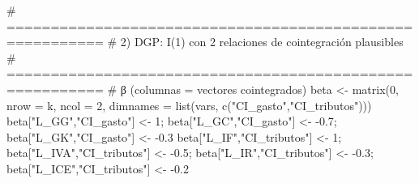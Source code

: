 \documentclass[
  spanish,
  letterpaper,
  DIV=11,
  numbers=noendperiod]{scrartcl}
\newenvironment{Shaded}{\begin{snugshade}}{\end{snugshade}}
\newcommand{\AttributeTok}[1]{\textcolor[rgb]{0.40,0.45,0.13}{#1}}
\newcommand{\CommentTok}[1]{\textcolor[rgb]{0.37,0.37,0.37}{#1}}
\newcommand{\DecValTok}[1]{\textcolor[rgb]{0.68,0.00,0.00}{#1}}
\newcommand{\FloatTok}[1]{\textcolor[rgb]{0.68,0.00,0.00}{#1}}
\newcommand{\FunctionTok}[1]{\textcolor[rgb]{0.28,0.35,0.67}{#1}}
\newcommand{\NormalTok}[1]{\textcolor[rgb]{0.00,0.23,0.31}{#1}}
\newcommand{\OtherTok}[1]{\textcolor[rgb]{0.00,0.23,0.31}{#1}}
\newcommand{\SpecialCharTok}[1]{\textcolor[rgb]{0.37,0.37,0.37}{#1}}
\newcommand{\StringTok}[1]{\textcolor[rgb]{0.13,0.47,0.30}{#1}}
\begin{document}
\begin{Shaded}
\begin{Highlighting}[]
\CommentTok{\# =========================================================}
\CommentTok{\# 2) DGP: I(1) con 2 relaciones de cointegración plausibles}
\CommentTok{\# =========================================================}
\CommentTok{\# β (columnas = vectores cointegrados)}
\NormalTok{beta }\OtherTok{\textless{}{-}} \FunctionTok{matrix}\NormalTok{(}\DecValTok{0}\NormalTok{, }\AttributeTok{nrow =}\NormalTok{ k, }\AttributeTok{ncol =} \DecValTok{2}\NormalTok{, }\AttributeTok{dimnames =} \FunctionTok{list}\NormalTok{(vars, }\FunctionTok{c}\NormalTok{(}\StringTok{"CI\_gasto"}\NormalTok{,}\StringTok{"CI\_tributos"}\NormalTok{)))}
\NormalTok{beta[}\StringTok{"L\_GG"}\NormalTok{,}\StringTok{"CI\_gasto"}\NormalTok{] }\OtherTok{\textless{}{-}} \DecValTok{1}\NormalTok{;   beta[}\StringTok{"L\_GC"}\NormalTok{,}\StringTok{"CI\_gasto"}\NormalTok{] }\OtherTok{\textless{}{-}} \SpecialCharTok{{-}}\FloatTok{0.7}\NormalTok{; beta[}\StringTok{"L\_GK"}\NormalTok{,}\StringTok{"CI\_gasto"}\NormalTok{] }\OtherTok{\textless{}{-}} \SpecialCharTok{{-}}\FloatTok{0.3}
\NormalTok{beta[}\StringTok{"L\_IF"}\NormalTok{,}\StringTok{"CI\_tributos"}\NormalTok{] }\OtherTok{\textless{}{-}} \DecValTok{1}\NormalTok{; beta[}\StringTok{"L\_IVA"}\NormalTok{,}\StringTok{"CI\_tributos"}\NormalTok{] }\OtherTok{\textless{}{-}} \SpecialCharTok{{-}}\FloatTok{0.5}\NormalTok{; beta[}\StringTok{"L\_IR"}\NormalTok{,}\StringTok{"CI\_tributos"}\NormalTok{] }\OtherTok{\textless{}{-}} \SpecialCharTok{{-}}\FloatTok{0.3}\NormalTok{; beta[}\StringTok{"L\_ICE"}\NormalTok{,}\StringTok{"CI\_tributos"}\NormalTok{] }\OtherTok{\textless{}{-}} \SpecialCharTok{{-}}\FloatTok{0.2}


\end{Highlighting}
\end{Shaded}
\end{document}
